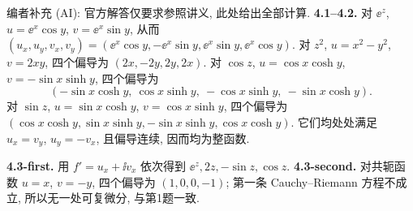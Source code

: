 \begin{solution}
编者补充 (AI): 官方解答仅要求参照讲义, 此处给出全部计算. \textbf{4.1--4.2.} 对 $\ee^z$, $u=\ee^x\cos y$, $v=\ee^x\sin y$, 从而 $(u_x,u_y,v_x,v_y)=(\ee^x\cos y,-\ee^x\sin y,\ee^x\sin y,\ee^x\cos y)$. 对 $z^2$, $u=x^2-y^2$, $v=2xy$, 四个偏导为 $(2x,-2y,2y,2x)$. 对 $\cos z$, $u=\cos x\cosh y$, $v=-\sin x\sinh y$, 四个偏导为
\[
(-\sin x\cosh y,\ \cos x\sinh y,\ -\cos x\sinh y,\ -\sin x\cosh y).
\]
对 $\sin z$, $u=\sin x\cosh y$, $v=\cos x\sinh y$, 四个偏导为 $(\cos x\cosh y,\sin x\sinh y,-\sin x\sinh y,\cos x\cosh y)$. 它们均处处满足 $u_x=v_y$, $u_y=-v_x$, 且偏导连续, 因而均为整函数.

\textbf{4.3-first.}\label{ass:rec2-4-3-first} 用 $f'=u_x+\ii v_x$ 依次得到 $\ee^z,2z,-\sin z,\cos z$. \textbf{4.3-second.}\label{ass:rec2-4-3-second} 对共轭函数 $u=x$, $v=-y$, 四个偏导为 $(1,0,0,-1)$; 第一条 Cauchy--Riemann 方程不成立, 所以无一处可复微分, 与第1题一致.
\end{solution}
